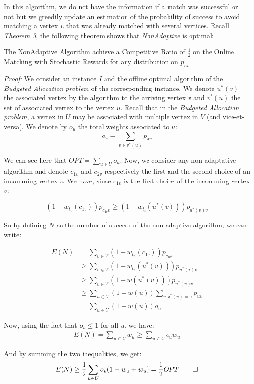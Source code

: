 \documentclass[12pt, twocolumn]{article}
\begin{document}
\par
\hspace{\parindent}In this algorithm, we do not have the information if a match was successful or not but we greedily update an estimation of the probability of success to avoid matching a vertex $u$ that was already matched with several vertices. Recall \textit{Theorem 3}, the following theorem shows that \textit{NonAdaptive} is optimal:

\begin{theorem}
    The NonAdaptive Algorithm achieve a Competitive Ratio of $\frac{1}{2}$ on the Online Matching with Stochastic Rewards for any distribution on $p_{uv}$
\end{theorem}



\par
\hspace{\parindent}\textit{Proof:} We consider an instance $I$ and the offline optimal algorithm of the \textit{Budgeted Allocation problem} of the corresponding instance. We denote $u^*(v)$ the associated vertex by the algorithm to the arriving vertex $v$ and $v^*(u)$ the set of associated vertex to the vertex $u$. Recall that in the \textit{Budgeted Allocation problem}, a vertex in $U$ may be associated with multiple vertex in $V$ (and vice-et-versa). We denote by $o_u$ the total weights associated to $u$:
\[ o_u = \sum_{v \in v^*(u)} p_{uv}\]

\par
\hspace{\parindent}We can see here that $OPT = \sum_{u \in U} o_u$. Now, we consider any non adaptative algorithm and denote $c_{1v}$ and $c_{2v}$ respectively the first and the second choice of an incomming vertex $v$. We have, since $c_{1v}$ is the first choice of the incomming vertex $v$:

\[ (1-w_{t_v}(c_{1v}))p_{c_{1v}v} \geq (1-w_{t_v}(u^*(v)))p_{u^*(v)v}\]

\par
\hspace{\parindent}So by defining $N$ as the number of success of the non adaptive algorithm, we can write:

\begin{align*}
    E(N) &= \sum_{v \in V} (1-w_{t_v}(c_{1v}))p_{c_{1v}v} \\
    &\geq \sum_{v \in V} (1-w_{t_v}(u^*(v)))p_{u^*(v)v} \\
    &\geq \sum_{v \in V} (1-w(u^*(v)))p_{u^*(v)v} \\
    &\geq \sum_{u \in U} (1- w(u)) \sum_{v:u^*(v)=u} p_{uv} \\
    &= \sum_{u \in U} (1- w(u)) o_u
\end{align*}
\par
\hspace{\parindent}Now, using the fact that $o_u\leq 1$ for all $u$, we have:
\begin{align*}
    E(N) = \sum_{u \in U} w_u \geq \sum_{u \in U} o_uw_u
\end{align*}
\par
\hspace{\parindent} And by summing the two inequalities, we get:
\[E(N) \geq \frac{1}{2} \sum_{u \in U}o_u(1-w_u+w_u) = \frac{1}{2} OPT \qed\]
\end{document}
